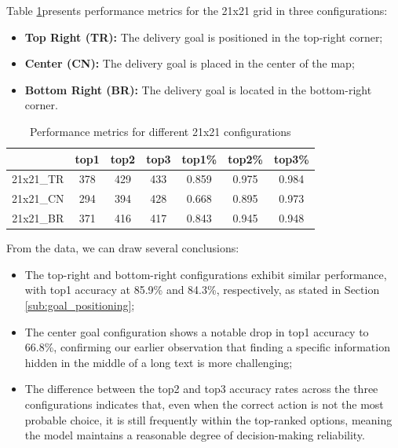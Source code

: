 Table \ref{tab:performance_21x21}presents performance metrics for the 21x21 grid
in three configurations:
\begin{itemize}
  \item \textbf{Top Right (TR):} The delivery goal is positioned in the top-right
    corner;

  \item \textbf{Center (CN):} The delivery goal is placed in the center of the
    map;

  \item \textbf{Bottom Right (BR):} The delivery goal is located in the bottom-right
    corner.
\end{itemize}

\begin{table}[ht]
  \centering
  \begin{tabular}{c|ccc|ccc}
              & top1 & top2 & top3 & top1\% & top2\% & top3\% \\
    \hline
    21x21\_TR & 378  & 429  & 433  & 0.859  & 0.975  & 0.984  \\
    21x21\_CN & 294  & 394  & 428  & 0.668  & 0.895  & 0.973  \\
    21x21\_BR & 371  & 416  & 417  & 0.843  & 0.945  & 0.948  \\
  \end{tabular}
  \caption{Performance metrics for different 21x21 configurations}
  \label{tab:performance_21x21}
\end{table}

From the data, we can draw several conclusions:
\begin{itemize}
  \item The top-right and bottom-right configurations exhibit similar performance,
    with top1 accuracy at 85.9\% and 84.3\%, respectively, as stated in Section
    \ref{sub:goal_positioning};

  \item The center goal configuration shows a notable drop in top1 accuracy to 66.8\%,
    confirming our earlier observation that finding a specific information hidden
    in the middle of a long text is more challenging;

  \item The difference between the top2 and top3 accuracy rates across the three
    configurations indicates that, even when the correct action is not the most
    probable choice, it is still frequently within the top-ranked options,
    meaning the model maintains a reasonable degree of decision-making
    reliability.
\end{itemize}

